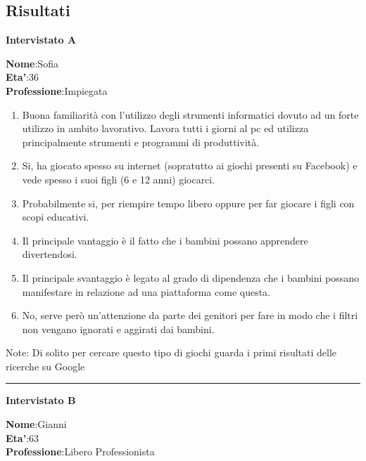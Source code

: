 \documentclass[../Report.tex]{subfiles}
\begin{document}
    \subsection{Risultati}
    \textbf{Intervistato A}

    \textbf{Nome}:Sofia\\
    \textbf{Eta'}:36\\
    \textbf{Professione}:Impiegata
    
    \begin{enumerate}
        \item Buona familiarità con l’utilizzo degli strumenti informatici dovuto ad un forte utilizzo in ambito lavorativo. Lavora tutti i giorni al pc ed utilizza principalmente strumenti e programmi di produttività. 
        \item Si, ha giocato spesso su internet (sopratutto ai giochi presenti su Facebook) e vede spesso i suoi figli (6 e 12 anni) giocarci. 
        \item Probabilmente si, per riempire tempo libero oppure per far giocare i figli con scopi educativi.
        \item Il principale vantaggio è il fatto che i bambini possano apprendere divertendosi. 
        \item Il principale svantaggio è legato al grado di dipendenza che i bambini possano manifestare in relazione ad una piattaforma come questa. 
        \item No, serve però un’attenzione da parte dei genitori per fare in modo che i filtri non vengano ignorati e aggirati dai bambini.
    \end{enumerate}

    Note: Di solito per cercare questo tipo di giochi guarda i primi risultati delle ricerche su Google\\

    \hrule
    \textbf{Intervistato B}

    \textbf{Nome}:Gianni\\
    \textbf{Eta'}:63\\
    \textbf{Professione}:Libero Professionista
    
\end{document}
